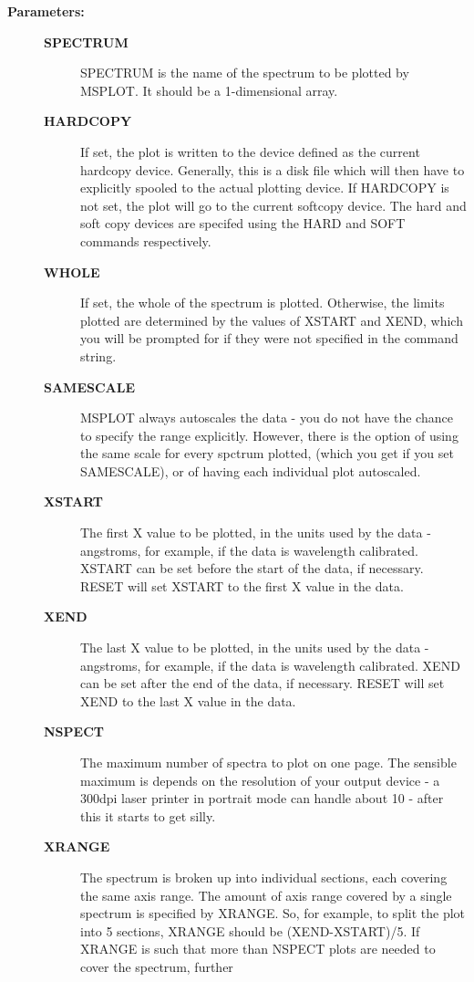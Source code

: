 \begin{description}
\begin{description}
\item [\textbf{Parameters:}]
\begin{description}
\item [\textbf{SPECTRUM}]
 SPECTRUM is the name of the spectrum to be plotted by MSPLOT.
 It should be a 1-dimensional array.
\item [\textbf{HARDCOPY}]
 If set, the plot is written to the device defined as the current
 hardcopy device.  Generally, this is a disk file which will then
 have to explicitly spooled to the actual plotting device.  If
 HARDCOPY is not set, the plot will go to the current softcopy
 device.  The hard and soft copy devices are specifed using the
 HARD and SOFT commands respectively.
\item [\textbf{WHOLE}]
 If set, the whole of the spectrum is plotted.
 Otherwise, the limits plotted are determined by the values of XSTART
 and XEND, which you will be prompted for if they were not specified
 in the command string.
\item [\textbf{SAMESCALE}]
 MSPLOT always autoscales the data - you do not have the chance to
 specify the range explicitly.  However, there is the option of using
 the same scale for every spctrum plotted, (which you get if you
 set SAMESCALE), or of having each individual plot autoscaled.
\item [\textbf{XSTART}]
 The first X value to be plotted, in the units used
 by the data - angstroms, for example, if the data is wavelength
 calibrated.  XSTART can be set before the start of the data, if
 necessary.  RESET will set XSTART to the first X value in the data.
\item [\textbf{XEND}]
 The last X value to be plotted, in the units used by
 the data - angstroms, for example, if the data is wavelength
 calibrated.  XEND can be set after the end of the data, if necessary.
 RESET will set XEND to the last X value in the data.
\item [\textbf{NSPECT}]
 The maximum number of spectra to plot on
 one page.  The sensible maximum is depends on the resolution of your
 output device - a 300dpi laser printer in portrait mode can handle
 about 10 - after this it starts to get silly.
\item [\textbf{XRANGE}]
 The spectrum is broken up into individual sections, each covering the
 same axis range.  The amount of axis range covered by a single
 spectrum is specified by XRANGE.  So, for example, to split the plot
 into 5 sections, XRANGE should be (XEND-XSTART)/5.  If XRANGE is such
 that more than NSPECT plots are needed to cover the spectrum, further

\end{description}
\end{description}
\end{description}
